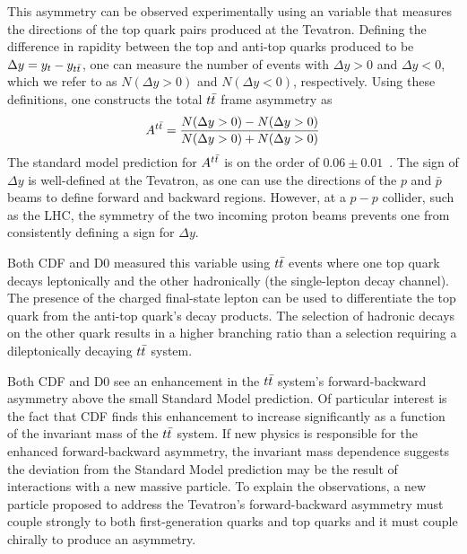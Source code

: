 This asymmetry can be observed experimentally using an variable that measures the directions of the top quark pairs produced at the Tevatron.
Defining the difference in rapidity between the top and anti-top quarks produced to be $\Delta y = y_{t} - y_{t\bar{t}}$,
one can measure the number of events with $\Delta y>0$ and $\Delta y<0$, which we refer to as $N(\Delta y>0)$ and $N(\Delta y < 0)$, respectively.
Using these definitions, one constructs the total $t\bar{t}$ frame asymmetry as
\begin{equation}
  \label{eq:FB_Asymmetry}
  A^{t\bar{t}} = \frac{N(\Delta y>0) - N(\Delta y>0)}{N(\Delta y>0) + N(\Delta y>0)}
\end{equation}
The standard model prediction for $A^{t\bar{t}}$ is on the order of $0.06 \pm 0.01$~\cite{Aaltonen:1318520}.
The sign of $\Delta y$ is well-defined at the Tevatron, as one can use the directions of the $p$ and $\bar{p}$ beams to 
define forward and backward regions.
However, at a $p-p$ collider, such as the LHC, the symmetry of the two incoming proton beams prevents one from consistently
defining a sign for $\Delta y$.

Both CDF and D0 measured this variable using $t\bar{t}$ events where one top quark decays leptonically and the other hadronically (the single-lepton decay channel).
The presence of the charged final-state lepton can be used to differentiate the top quark from the anti-top quark's decay products.
The selection of hadronic decays on the other quark results in a higher branching ratio than a selection requiring a dileptonically decaying $t\bar{t}$ system.

Both CDF and D0 see an enhancement in the $t\bar{t}$ system's forward-backward asymmetry above the small Standard Model prediction.
Of particular interest is the fact that CDF finds this enhancement to increase significantly as a function of the invariant mass of the $t\bar{t}$ system.
If new physics is responsible for the enhanced forward-backward asymmetry, the invariant mass dependence suggests the deviation from the Standard Model prediction may be the result of interactions with a new massive particle. %
To explain the observations, a new particle proposed to address the Tevatron's forward-backward asymmetry must couple strongly
to both first-generation quarks and top quarks and it must couple chirally to produce an asymmetry.

